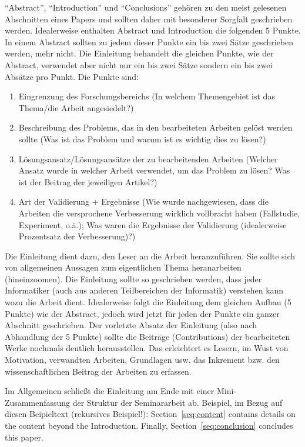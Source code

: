 \documentclass[runningheads,a4paper]{uwsese}
\begin{document}
``Abstract'', ``Introduction'' und ``Conclusions'' gehören zu den meist gelesenen Abschnitten eines Papers und sollten daher mit besonderer Sorgfalt geschrieben werden. Idealerweise enthalten Abstract und Introduction die folgenden 5 Punkte. In einem Abstract sollten zu jedem dieser Punkte ein bis zwei Sätze geschrieben werden, mehr nicht. Die Einleitung behandelt die gleichen Punkte, wie der Abstract, verwendet aber nicht nur ein bis zwei Sätze sondern ein bis zwei Absätze pro Punkt. Die Punkte sind:

\begin{enumerate}
	\item Eingrenzung des Forschungsbereichs (In welchem Themengebiet ist das Thema/die Arbeit angesiedelt?)
	\item Beschreibung des Problems, das in den bearbeiteten Arbeiten gelöst werden sollte (Was ist das Problem und warum ist es wichtig dies zu lösen?)
	\item Lösungsansatz/Lösungsansätze der zu bearbeitenden Arbeiten (Welcher Ansatz wurde in welcher Arbeit verwendet, um das Problem zu lösen? Was ist der Beitrag der jeweiligen Artikel?)
	\item Art der Validierung + Ergebnisse (Wie wurde nachgewiesen, dass die Arbeiten die versprochene Verbesserung wirklich vollbracht haben (Fallstudie, Experiment, o.ä.); Was waren die Ergebnisse der Validierung (idealerweise Prozentsatz der Verbesserung)?)
\end{enumerate}

 Die Einleitung dient dazu, den Leser an die Arbeit heranzuführen. Sie sollte sich von allgemeinen Aussagen zum eigentlichen Thema heranarbeiten (hineinzoomen). Die Einleitung sollte so geschrieben werden, dass jeder Informatiker (auch aus anderen Teilbereichen der Informatik) verstehen kann wozu die Arbeit dient. Idealerweise folgt die Einleitung dem gleichen Aufbau (5 Punkte) wie der Abstract, jedoch wird jetzt für jeden der Punkte ein ganzer Abschnitt geschrieben. Der vorletzte Absatz der Einleitung (also nach Abhandlung der 5 Punkte) sollte die Beiträge (Contributions) der bearbeiteten Werke nochmals deutlich herausstellen. Das erleichtert es Lesern, im Wust von Motivation, verwandten Arbeiten, Grundlagen usw. das Inkrement bzw. den wissenschaftlichen Beitrag der Arbeiten zu erfassen.

Im Allgemeinen schließt die Einleitung am Ende mit einer Mini-Zusammen\-fassung der Struktur der Seminararbeit ab. Beispiel, im Bezug auf diesen Beipieltext (rekursives Beispiel!): Section~\ref{seq:content} contains details on the content beyond the Introduction. Finally, Section~\ref{seq:conclusion} concludes this paper.
\end{document}
